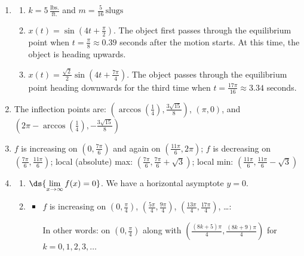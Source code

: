 \documentclass{ximera}
\begin{document}
\begin{enumerate}
\setcounter{enumi}{\value{HW}}
\addtocounter{enumi}{1}

\item  \begin{enumerate} \item $k = 5 \, \frac{\text{lbs.}}{\text{ft.}}$ and $m = \frac{5}{16} \, \text{slugs}$

\item  $x(t) = \sin\left(4t + \frac{\pi}{2}\right)$.  The object first passes through the equilibrium point when $t = \frac{\pi}{8} \approx 0.39$ seconds after the motion starts.  At this time, the object is heading upwards.

\item  $x(t) = \frac{\sqrt{2}}{2} \sin\left(4t + \frac{7\pi}{4}\right)$.  The object passes through the equilibrium point heading downwards for the third time when $t = \frac{17\pi}{16} \approx 3.34$ seconds.

\end{enumerate}

\setcounter{HW}{\value{enumi}}

\item  The inflection points are:  $\left( \arccos\left(\frac{1}{4}\right), \frac{3 \sqrt{15}}{8} \right)$, $( \pi, 0)$, and $\left( 2\pi - \arccos\left(\frac{1}{4}\right), - \frac{3 \sqrt{15}}{8} \right)$

\item  $f$ is increasing on $\left(0, \frac{7\pi}{6} \right)$ and again on $\left(\frac{11\pi}{6}, 2\pi \right)$;  $f$ is decreasing on  $\left(\frac{7 \pi}{6}, \frac{11\pi}{6} \right)$; local (absolute) max:  $\left(\frac{7\pi}{6}, \frac{7\pi}{6} + \sqrt{3}\right)$; local min:  $\left(\frac{11\pi}{6}, \frac{11\pi}{6} - \sqrt{3}\right)$

\item  \begin{enumerate} \item  $\ds{\lim_{x \rightarrow \infty} f(x) = 0}$.  We have a horizontal asymptote $y = 0$. 

\item  \begin{itemize} \item $f$ is increasing on $\left(0, \frac{\pi}{4} \right)$, $\left(\frac{5\pi}{4}, \frac{9 \pi}{4} \right)$, $\left(\frac{13\pi}{4}, \frac{17 \pi}{4} \right)$, \ldots :  

In other words: on $\left(0, \frac{\pi}{4} \right)$ along with $\left( \frac{(8k+5) \pi}{4}, \frac{(8k+9)\pi}{4}\right)$ for $k = 0, 1, 2, 3, \ldots$


\end{itemize}
\end{enumerate}
\end{enumerate}
\end{document}
